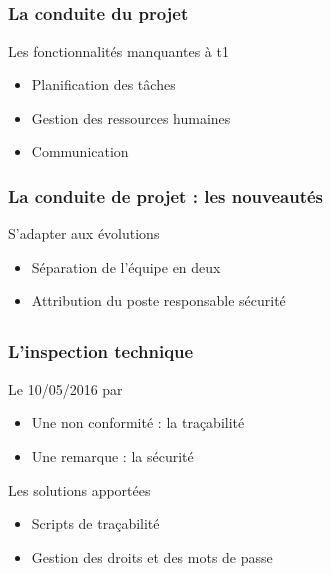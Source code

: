 \speaker{\Pierre{}}
\subsection{} %

\begin{frame}
\frametitle{La conduite du projet}
\begin{block}{Les fonctionnalités manquantes à t1}
\begin{itemize}
	\item Planification des tâches
	\item Gestion des ressources humaines
	\item Communication
	
\end{itemize}
\end{block}
\end{frame}

\begin{frame}
\frametitle{La conduite de projet : les nouveautés}
\begin{block}{S'adapter aux évolutions}
\begin{itemize}
	\item Séparation de l'équipe en deux
	\item Attribution du poste responsable sécurité
\end{itemize}
\end{block}

\end{frame}

\subsection{}
\begin{frame}
\frametitle{L'inspection technique}
\begin{block}{Le 10/05/2016 par \nomTuteurPedago{}}
\begin{itemize}
	\item Une non conformité : la traçabilité
	\item Une remarque : la sécurité
\end{itemize}
\end{block}
\begin{block}{Les solutions apportées}
\begin{itemize}
	\item Scripts de traçabilité
	\item Gestion des droits et des mots de passe
\end{itemize}
\end{block}
\end{frame}

